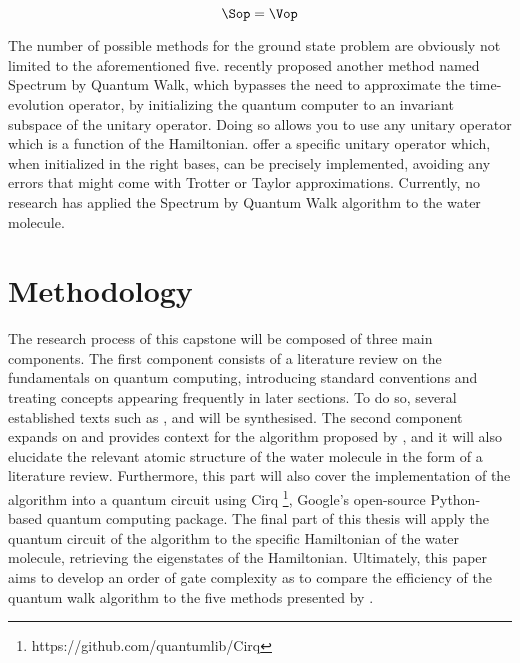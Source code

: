 $$\Sop = \Vop$$

The number of possible methods for the ground state problem are obviously not limited to the aforementioned five. \textcite{poulin} recently proposed another method named Spectrum by Quantum Walk, which bypasses the need to approximate the time-evolution operator, by initializing the quantum computer to an invariant subspace of the unitary operator. Doing so allows you to use any unitary operator which is a function of the Hamiltonian. \textcite{poulin} offer a specific unitary operator which, when initialized in the right bases, can be precisely implemented, avoiding any errors that might come with Trotter or Taylor approximations. Currently, no research has applied the Spectrum by Quantum Walk algorithm to the water molecule.
\section{Methodology}


The research process of this capstone will be composed of three main components. The first component consists of a literature review on the fundamentals on quantum computing, introducing standard conventions and treating concepts appearing frequently in later sections. To do so, several established texts such as \textcite{nielsen}, \textcite{steane} and \textcite{Divincenzo} will be synthesised. The second component expands on and provides context for the algorithm proposed by \textcite{poulin}, and it will also elucidate the relevant atomic structure of the water molecule in the form of a literature review. Furthermore, this part will also cover the implementation of the algorithm into a quantum circuit using Cirq \footnote{https://github.com/quantumlib/Cirq}, Google's open-source Python-based quantum computing package. The final part of this thesis will apply the quantum circuit of the algorithm to the specific Hamiltonian of the water molecule, retrieving the eigenstates of the Hamiltonian. Ultimately, this paper aims to develop an order of gate complexity as to compare the efficiency of the quantum walk algorithm to the five methods presented by \textcite{poulin}.
